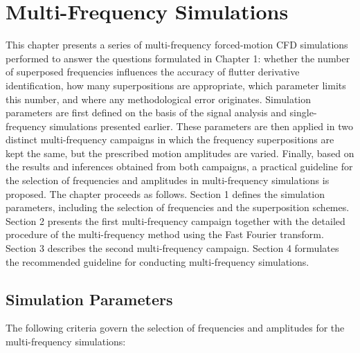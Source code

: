 \documentclass[../main]{subfiles}
\begin{document}
\preto\subsection{\FloatBarrier}
\preto\section{\FloatBarrier}

\chapter{Multi-Frequency Simulations}
\label{cha:multi_frequency}

This chapter presents a series of multi-frequency forced-motion CFD simulations performed to answer the questions 
formulated in Chapter 1: whether the number of superposed frequencies influences the accuracy of flutter derivative 
identification, how many superpositions are appropriate, which parameter limits this number, and where any methodological 
error originates.
Simulation parameters are first defined on the basis of the signal analysis and single-frequency simulations presented 
earlier.
These parameters are then applied in two distinct multi-frequency campaigns in which the frequency superpositions 
are kept the same, but the prescribed motion amplitudes are varied.
Finally, based on the results and inferences obtained from both campaigns, a practical guideline for the selection of frequencies and amplitudes in multi-frequency simulations is proposed.
The chapter proceeds as follows. Section 1 defines the simulation parameters, including the selection of frequencies and 
the superposition schemes.
Section 2 presents the first multi-frequency campaign together with the detailed procedure of 
the multi-frequency method using the Fast Fourier transform.
Section 3 describes the second multi-frequency campaign. 
Section 4 formulates the recommended guideline for conducting multi-frequency simulations.

\section{Simulation Parameters}

The following criteria govern the selection of frequencies and amplitudes for the 
multi-frequency simulations:
\end{document}
